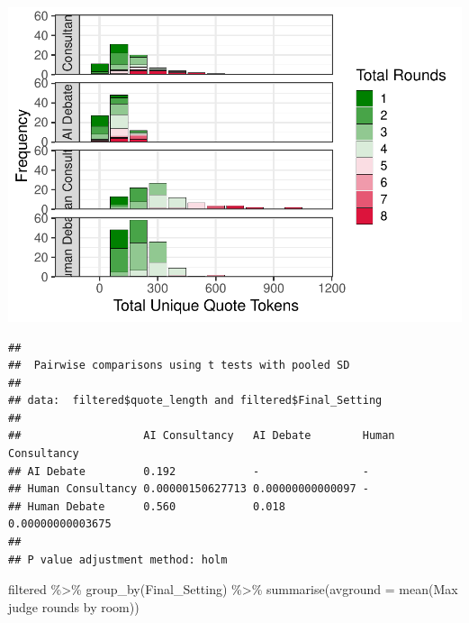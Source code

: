 \documentclass[
]{article}
\newenvironment{Shaded}{\begin{snugshade}}{\end{snugshade}}
\newcommand{\AttributeTok}[1]{\textcolor[rgb]{0.77,0.63,0.00}{#1}}
\newcommand{\FunctionTok}[1]{\textcolor[rgb]{0.00,0.00,0.00}{#1}}
\newcommand{\NormalTok}[1]{#1}
\newcommand{\SpecialCharTok}[1]{\textcolor[rgb]{0.00,0.00,0.00}{#1}}
\newcommand{\StringTok}[1]{\textcolor[rgb]{0.31,0.60,0.02}{#1}}
\begin{document}
\includegraphics[width=1\linewidth]{debate-2309_files/figure-latex/rounds graph-2}

\begin{Shaded}
\end{Shaded}

\begin{verbatim}
## 
##  Pairwise comparisons using t tests with pooled SD 
## 
## data:  filtered$quote_length and filtered$Final_Setting 
## 
##                   AI Consultancy   AI Debate        Human Consultancy
## AI Debate         0.192            -                -                
## Human Consultancy 0.00000150627713 0.00000000000097 -                
## Human Debate      0.560            0.018            0.00000000003675 
## 
## P value adjustment method: holm
\end{verbatim}

\begin{Shaded}
\begin{Highlighting}[]
\NormalTok{filtered }\SpecialCharTok{\%\textgreater{}\%} \FunctionTok{group\_by}\NormalTok{(Final\_Setting) }\SpecialCharTok{\%\textgreater{}\%} \FunctionTok{summarise}\NormalTok{(}\AttributeTok{avground =} \FunctionTok{mean}\NormalTok{(}\StringTok{\textasciigrave{}}\AttributeTok{Max judge rounds by room}\StringTok{\textasciigrave{}}\NormalTok{))}
\end{Highlighting}
\end{Shaded}
\end{document}
